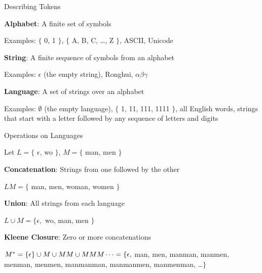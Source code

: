 \documentclass{plt}
\begin{document}
\begin{frame}{Describing Tokens}

\textbf{Alphabet}: A finite set of symbols

Examples: $\{$ 0, 1 $\}$, $\{$ A, B, C, \ldots, Z $\}$, ASCII, Unicode

\vspace{2pc}

\textbf{String}: A finite sequence of symbols from an alphabet

Examples: $\epsilon$ (the empty string), Ronghui, $\alpha\beta\gamma$

\vspace{2pc}

\textbf{Language}: A set of strings over an alphabet

Examples: $\emptyset$ (the empty language), $\{$ 1, 11, 111, 1111
$\}$, all English words, strings that start with a letter followed by
any sequence of letters and digits

\end{frame}

\begin{frame}{Operations on Languages}

Let $L = \{$ $\epsilon$, wo $\}$, $M = \{$ man, men $\}$

\vspace{1pc}

\textbf{Concatenation}: Strings from one followed by the other

$LM = \{$ man, men, woman, women $\}$

\vspace{1pc}

\textbf{Union}: All strings from each language

$L \cup M = \{ \epsilon, $ wo, man, men $\}$

\vspace{1pc}

\textbf{Kleene Closure}: Zero or more concatenations

$M^* = \{ \epsilon \} \cup M \cup MM \cup MMM \cdots = \break
 \{ \epsilon, $ man, men, manman, manmen, menman, menmen,
manmanman, manmanmen, manmenman, \ldots $\}$

\end{frame}
%
%
%
%
%
%
\end{document}
